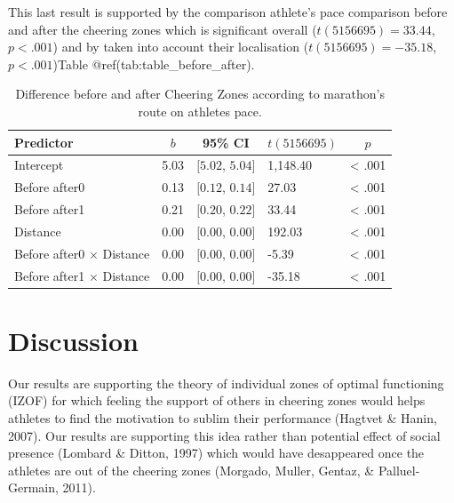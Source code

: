 \documentclass[,man]{apa6}
\theoremstyle{definition}
\theoremstyle{definition}
\theoremstyle{definition}
\theoremstyle{remark}
\begin{document}
This last result is supported by the comparison athlete's pace
comparison before and after the cheering zones which is significant
overall (\(t(5156695) = 33.44\), \(p < .001\)) and by taken into account
their localisation (\(t(5156695) = -35.18\), \(p < .001\))Table
@ref(tab:table\_before\_after).

\begin{table}[tbp]
\begin{center}
\begin{threeparttable}
\caption{\label{tab:table_before_after}Difference before and after Cheering Zones according to marathon's route on athletes pace.}
\begin{tabular}{lllll}
\toprule
Predictor & \multicolumn{1}{c}{$b$} & \multicolumn{1}{c}{95\% CI} & \multicolumn{1}{c}{$t(5156695)$} & \multicolumn{1}{c}{$p$}\\
\midrule
Intercept & 5.03 & $[5.02$, $5.04]$ & 1,148.40 & < .001\\
Before after0 & 0.13 & $[0.12$, $0.14]$ & 27.03 & < .001\\
Before after1 & 0.21 & $[0.20$, $0.22]$ & 33.44 & < .001\\
Distance & 0.00 & $[0.00$, $0.00]$ & 192.03 & < .001\\
Before after0 $\times$ Distance & 0.00 & $[0.00$, $0.00]$ & -5.39 & < .001\\
Before after1 $\times$ Distance & 0.00 & $[0.00$, $0.00]$ & -35.18 & < .001\\
\bottomrule
\end{tabular}
\end{threeparttable}
\end{center}
\end{table}

\section{Discussion}\label{discussion}

Our results are supporting the theory of individual zones of optimal
functioning (IZOF) for which feeling the support of others in cheering
zones would helps athletes to find the motivation to sublim their
performance (Hagtvet \& Hanin, 2007). Our results are supporting this
idea rather than potential effect of social presence (Lombard \& Ditton,
1997) which would have desappeared once the athletes are out of the
cheering zones (Morgado, Muller, Gentaz, \& Palluel-Germain, 2011).

\newpage
\end{document}
